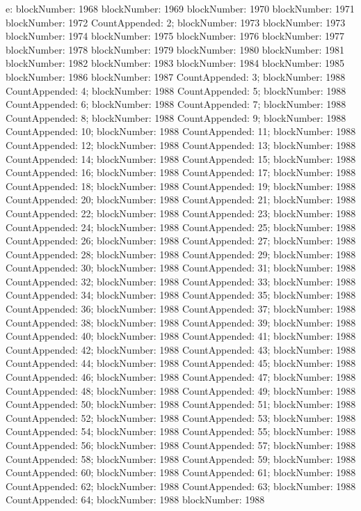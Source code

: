 \documentclass[german]{../uebung}
\begin{document}
\begin{exercise}{1}
    e:
    blockNumber: 1968
    blockNumber: 1969
    blockNumber: 1970
    blockNumber: 1971
    blockNumber: 1972
    CountAppended: 2; blockNumber: 1973
    blockNumber: 1973
    blockNumber: 1974
    blockNumber: 1975
    blockNumber: 1976
    blockNumber: 1977
    blockNumber: 1978
    blockNumber: 1979
    blockNumber: 1980
    blockNumber: 1981
    blockNumber: 1982
    blockNumber: 1983
    blockNumber: 1984
    blockNumber: 1985
    blockNumber: 1986
    blockNumber: 1987
    CountAppended: 3; blockNumber: 1988
    CountAppended: 4; blockNumber: 1988
    CountAppended: 5; blockNumber: 1988
    CountAppended: 6; blockNumber: 1988
    CountAppended: 7; blockNumber: 1988
    CountAppended: 8; blockNumber: 1988
    CountAppended: 9; blockNumber: 1988
    CountAppended: 10; blockNumber: 1988
    CountAppended: 11; blockNumber: 1988
    CountAppended: 12; blockNumber: 1988
    CountAppended: 13; blockNumber: 1988
    CountAppended: 14; blockNumber: 1988
    CountAppended: 15; blockNumber: 1988
    CountAppended: 16; blockNumber: 1988
    CountAppended: 17; blockNumber: 1988
    CountAppended: 18; blockNumber: 1988
    CountAppended: 19; blockNumber: 1988
    CountAppended: 20; blockNumber: 1988
    CountAppended: 21; blockNumber: 1988
    CountAppended: 22; blockNumber: 1988
    CountAppended: 23; blockNumber: 1988
    CountAppended: 24; blockNumber: 1988
    CountAppended: 25; blockNumber: 1988
    CountAppended: 26; blockNumber: 1988
    CountAppended: 27; blockNumber: 1988
    CountAppended: 28; blockNumber: 1988
    CountAppended: 29; blockNumber: 1988
    CountAppended: 30; blockNumber: 1988
    CountAppended: 31; blockNumber: 1988
    CountAppended: 32; blockNumber: 1988
    CountAppended: 33; blockNumber: 1988
    CountAppended: 34; blockNumber: 1988
    CountAppended: 35; blockNumber: 1988
    CountAppended: 36; blockNumber: 1988
    CountAppended: 37; blockNumber: 1988
    CountAppended: 38; blockNumber: 1988
    CountAppended: 39; blockNumber: 1988
    CountAppended: 40; blockNumber: 1988
    CountAppended: 41; blockNumber: 1988
    CountAppended: 42; blockNumber: 1988
    CountAppended: 43; blockNumber: 1988
    CountAppended: 44; blockNumber: 1988
    CountAppended: 45; blockNumber: 1988
    CountAppended: 46; blockNumber: 1988
    CountAppended: 47; blockNumber: 1988
    CountAppended: 48; blockNumber: 1988
    CountAppended: 49; blockNumber: 1988
    CountAppended: 50; blockNumber: 1988
    CountAppended: 51; blockNumber: 1988
    CountAppended: 52; blockNumber: 1988
    CountAppended: 53; blockNumber: 1988
    CountAppended: 54; blockNumber: 1988
    CountAppended: 55; blockNumber: 1988
    CountAppended: 56; blockNumber: 1988
    CountAppended: 57; blockNumber: 1988
    CountAppended: 58; blockNumber: 1988
    CountAppended: 59; blockNumber: 1988
    CountAppended: 60; blockNumber: 1988
    CountAppended: 61; blockNumber: 1988
    CountAppended: 62; blockNumber: 1988
    CountAppended: 63; blockNumber: 1988
    CountAppended: 64; blockNumber: 1988
    blockNumber: 1988


\end{exercise}
\end{document}
